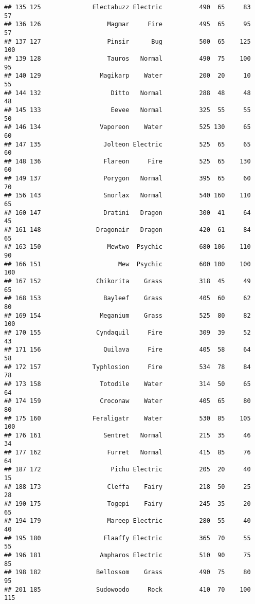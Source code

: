 \documentclass[
]{article}
\begin{document}
\begin{verbatim}
## 135 125              Electabuzz Electric          490  65     83      57
## 136 126                  Magmar     Fire          495  65     95      57
## 137 127                  Pinsir      Bug          500  65    125     100
## 139 128                  Tauros   Normal          490  75    100      95
## 140 129                Magikarp    Water          200  20     10      55
## 144 132                   Ditto   Normal          288  48     48      48
## 145 133                   Eevee   Normal          325  55     55      50
## 146 134                Vaporeon    Water          525 130     65      60
## 147 135                 Jolteon Electric          525  65     65      60
## 148 136                 Flareon     Fire          525  65    130      60
## 149 137                 Porygon   Normal          395  65     60      70
## 156 143                 Snorlax   Normal          540 160    110      65
## 160 147                 Dratini   Dragon          300  41     64      45
## 161 148               Dragonair   Dragon          420  61     84      65
## 163 150                  Mewtwo  Psychic          680 106    110      90
## 166 151                     Mew  Psychic          600 100    100     100
## 167 152               Chikorita    Grass          318  45     49      65
## 168 153                 Bayleef    Grass          405  60     62      80
## 169 154                Meganium    Grass          525  80     82     100
## 170 155               Cyndaquil     Fire          309  39     52      43
## 171 156                 Quilava     Fire          405  58     64      58
## 172 157              Typhlosion     Fire          534  78     84      78
## 173 158                Totodile    Water          314  50     65      64
## 174 159                Croconaw    Water          405  65     80      80
## 175 160              Feraligatr    Water          530  85    105     100
## 176 161                 Sentret   Normal          215  35     46      34
## 177 162                  Furret   Normal          415  85     76      64
## 187 172                   Pichu Electric          205  20     40      15
## 188 173                  Cleffa    Fairy          218  50     25      28
## 190 175                  Togepi    Fairy          245  35     20      65
## 194 179                  Mareep Electric          280  55     40      40
## 195 180                 Flaaffy Electric          365  70     55      55
## 196 181                Ampharos Electric          510  90     75      85
## 198 182               Bellossom    Grass          490  75     80      95
## 201 185               Sudowoodo     Rock          410  70    100     115

\end{verbatim}
\end{document}
